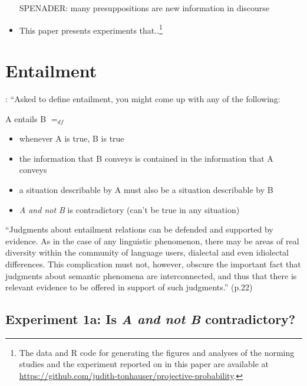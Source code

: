 \documentclass[11pt,fleqn]{article}
\newcommand{\6}{\mbox{$[\hspace*{-.6mm}[$}}
\newcommand{\9}{\mbox{$]\hspace*{-.6mm}]$}}
\begin{document}
\begin{itemize}
SPENADER: many presuppositions are new information in discourse 

\item This paper presents experiments that..\footnote{\label{f-github}The
data and R code for generating the figures and analyses
of the norming studies and the experiment reported on in this paper are available at \url{https://github.com/judith-tonhauser/projective-probability}.}

\end{itemize}

\newpage

\section{Entailment}\label{s-entailment}

\citealt[19f.]{ccmg90}: ``Asked to define entailment, you might come up with any of the following:

\begin{exe}
\ex A entails B $=_{df}$

\begin{itemize}[leftmargin=5ex,topsep=0pt,itemsep=-2pt]

\item whenever A is true, B is true

\item the information that B conveys is contained in the information that A conveys

\item a situation describable by A must also be a situation describable by B

\item {\em A and not B} is contradictory (can't be true in any situation)

\end{itemize}
\end{exe}

``Judgments about entailment relations can be defended and supported by evidence. As in the case of any linguistic phenomenon, there may be areas of real diversity within the community of language users, dialectal and even idiolectal differences. This complication must not, however, obscure the important fact that judgments about semantic phenomena are interconnected, and thus that there is relevant evidence to be offered in support of such judgments.'' (p.22)

\subsection{Experiment 1a: Is {\em A and not B} contradictory?}
\end{document}
